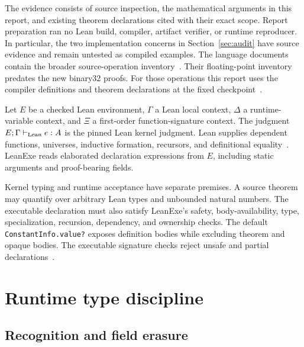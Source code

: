 \documentclass[11pt]{article}
\newcommand{\code}[1]{\texttt{#1}}
\begin{document}
The evidence consists of source inspection, the mathematical arguments in this report, and existing theorem declarations cited with their exact scope.  Report preparation ran no Lean build, compiler, artifact verifier, or runtime reproducer.  In particular, the two implementation concerns in Section~\ref{sec:audit} have source evidence and remain untested as compiled examples.  The language documents contain the broader source-operation inventory~\cite{typetheory,specification}.  Their floating-point inventory predates the new binary32 proofs.  For those operations this report uses the compiler definitions and theorem declarations at the fixed checkpoint~\cite{types,fp32proofs}.

Let $E$ be a checked Lean environment, $\Gamma$ a Lean local context, $\Delta$ a runtime-variable context, and $\Xi$ a first-order function-signature context.  The judgment $E;\Gamma\vdash_{\rm Lean} e:A$ is the pinned Lean kernel judgment.  Lean supplies dependent functions, universes, inductive formation, recursors, and definitional equality~\cite{lean}.  LeanExe reads elaborated declaration expressions from $E$, including static arguments and proof-bearing fields.

Kernel typing and runtime acceptance have separate premises.  A source theorem may quantify over arbitrary Lean types and unbounded natural numbers.  The executable declaration must also satisfy LeanExe's safety, body-availability, type, specialization, recursion, dependency, and ownership checks.  The default \code{ConstantInfo.value?} exposes definition bodies while excluding theorem and opaque bodies.  The executable signature checks reject unsafe and partial declarations~\cite{types,extract}.

\section{Runtime type discipline}

\subsection{Recognition and field erasure}
\end{document}
